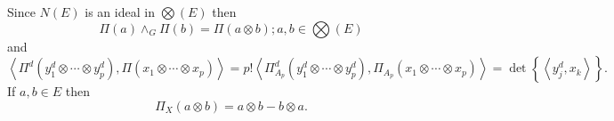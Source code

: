 \documentclass[aps,preprint]{revtex4}%
\begin{document}
Since $N\left(  E\right)  $ is an ideal in $%
{\textstyle\bigotimes}
\left(  E\right)  $ then
\begin{equation}
\Pi\left(  a\right)  \wedge_{G}\Pi\left(  b\right)  =\Pi\left(  a\otimes
b\right)  ;a,b\in%
{\textstyle\bigotimes}
\left(  E\right)
\end{equation}
and
\begin{equation}
\left\langle \Pi^{d}\left(  y_{1}^{d}\otimes\cdots\otimes y_{p}^{d}\right)
,\Pi\left(  x_{1}\otimes\cdots\otimes x_{p}\right)  \right\rangle
=p!\left\langle \Pi_{A_{p}}^{d}\left(  y_{1}^{d}\otimes\cdots\otimes y_{p}%
^{d}\right)  ,\Pi_{A_{p}}\left(  x_{1}\otimes\cdots\otimes x_{p}\right)
\right\rangle =\det\left\{  \left\langle y_{j}^{d},x_{k}\right\rangle
\right\}  .
\end{equation}
If $a,b\in E$ then
\begin{equation}
\Pi_{X}\left(  a\otimes b\right)  =a\otimes b-b\otimes a.
\end{equation}
\end{document}
